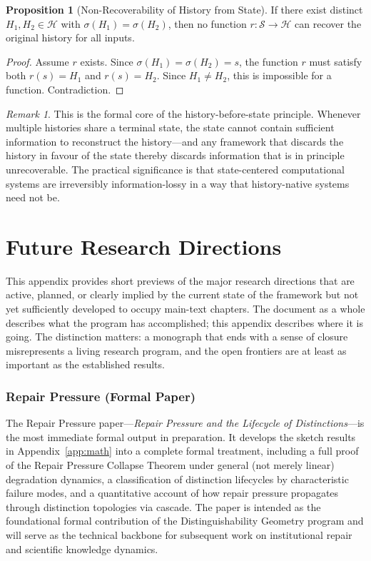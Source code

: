 \documentclass[11pt, oneside]{book}
\theoremstyle{definition}
\newtheorem{proposition}{Proposition}[chapter]
\theoremstyle{remark}
\newtheorem{remark}{Remark}[chapter]
\begin{document}
\begin{proposition}[Non-Recoverability of History from State]
If there exist distinct $H_1, H_2 \in \mathcal{H}$ with $\sigma(H_1) = \sigma(H_2)$, then no function $r:\mathcal{S}\to\mathcal{H}$ can recover the original history for all inputs.
\end{proposition}

\begin{proof}
Assume $r$ exists. Since $\sigma(H_1) = \sigma(H_2) = s$, the function $r$ must satisfy both $r(s) = H_1$ and $r(s) = H_2$. Since $H_1 \neq H_2$, this is impossible for a function. Contradiction.
\end{proof}

\begin{remark}
This is the formal core of the history-before-state principle. Whenever multiple histories share a terminal state, the state cannot contain sufficient information to reconstruct the history---and any framework that discards the history in favour of the state thereby discards information that is in principle unrecoverable. The practical significance is that state-centered computational systems are irreversibly information-lossy in a way that history-native systems need not be.
\end{remark}

\chapter{Future Research Directions}

This appendix provides short previews of the major research directions that are active, planned, or clearly implied by the current state of the framework but not yet sufficiently developed to occupy main-text chapters. The document as a whole describes what the program has accomplished; this appendix describes where it is going. The distinction matters: a monograph that ends with a sense of closure misrepresents a living research program, and the open frontiers are at least as important as the established results.

\subsection*{Repair Pressure (Formal Paper)}

The Repair Pressure paper---\textit{Repair Pressure and the Lifecycle of Distinctions}---is the most immediate formal output in preparation. It develops the sketch results in Appendix~\ref{app:math} into a complete formal treatment, including a full proof of the Repair Pressure Collapse Theorem under general (not merely linear) degradation dynamics, a classification of distinction lifecycles by characteristic failure modes, and a quantitative account of how repair pressure propagates through distinction topologies via cascade. The paper is intended as the foundational formal contribution of the Distinguishability Geometry program and will serve as the technical backbone for subsequent work on institutional repair and scientific knowledge dynamics.
\end{document}
